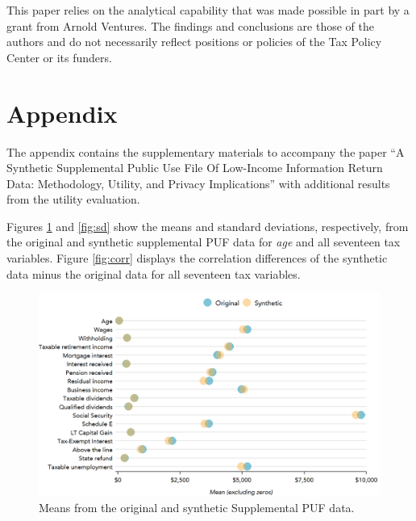 \documentclass[11pt,runningheads,oribibl]{llncs}
\begin{document}
This paper relies on the analytical capability that was made possible in part by a grant from Arnold Ventures. The ﬁndings and conclusions are those of the authors and do not necessarily reﬂect positions or policies of the Tax Policy Center or its funders.





\section*{Appendix}
The appendix contains the supplementary materials to accompany the paper ``A Synthetic Supplemental Public Use File Of Low-Income Information Return Data: Methodology, Utility, and Privacy Implications'' with additional results from the utility evaluation.

Figures \ref{fig:mean} and \ref{fig:sd} show the means and standard deviations, respectively, from the original and synthetic supplemental PUF data for \textit{age} and all seventeen tax variables. Figure \ref{fig:corr} displays the correlation differences of the synthetic data minus the original data for all seventeen tax variables.

\begin{figure}
    \includegraphics[width=\textwidth]{figures/means-1.png}
    \caption{Means from the original and synthetic Supplemental PUF data.} \label{fig:mean}
\end{figure}
\end{document}
